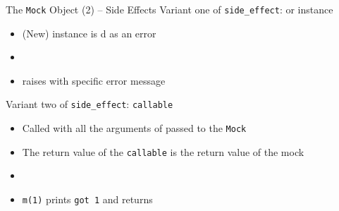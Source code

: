\begin{frame}{The \texttt{Mock} Object (2) -- Side Effects}
%
Variant one of \texttt{side\_effect}:  or instance
\begin{itemize}
\item (New) instance is d as an error
\item {}
\item[\Thus]  raises   with specific error message
\end{itemize}
\pause
\vspace{6pt}
Variant two of \texttt{side\_effect}: \texttt{callable}
\begin{itemize}
\item Called with all the arguments of passed to the \texttt{Mock}
\item The return value of the \texttt{callable} is the return value of the mock
\item {}
\item[\Thus] \texttt{m(1)} prints \texttt{got 1} and returns 
\end{itemize}
%
\end{frame}


